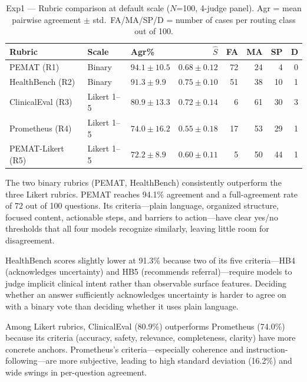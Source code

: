 \documentclass[conference]{IEEEtran}
\begin{document}
\begin{table}[t]
\caption{Exp1 --- Rubric comparison at default scale ($N$=100, 4-judge panel).
Agr = mean pairwise agreement $\pm$ std.\ FA/MA/SP/D = number of cases per routing class out of 100.}
\label{tab:exp1}
\begin{center}
\small
\begin{tabular}{lllrrrrr}
\toprule
\textbf{Rubric} & \textbf{Scale} & \textbf{Agr\%} & \textbf{$\hat{S}$} & \textbf{FA} & \textbf{MA} & \textbf{SP} & \textbf{D} \\
\midrule
PEMAT (R1)        & Binary      & $94.1 \pm 10.5$ & $0.68 \pm 0.12$ & 72 & 24 &  4 & 0 \\
HealthBench (R2)  & Binary      & $91.3 \pm 9.9$  & $0.75 \pm 0.10$ & 51 & 38 & 10 & 1 \\
ClinicalEval (R3) & Likert 1--5 & $80.9 \pm 13.3$ & $0.72 \pm 0.14$ &  6 & 61 & 30 & 3 \\
Prometheus (R4)   & Likert 1--5 & $74.0 \pm 16.2$ & $0.55 \pm 0.18$ & 17 & 53 & 29 & 1 \\
PEMAT-Likert (R5) & Likert 1--5 & $72.2 \pm 8.9$  & $0.60 \pm 0.11$ &  5 & 50 & 44 & 1 \\
\bottomrule
\end{tabular}
\end{center}
\end{table}

The two binary rubrics (PEMAT, HealthBench) consistently outperform
the three Likert rubrics. PEMAT reaches 94.1\% agreement and a
full-agreement rate of 72 out of 100 questions. Its criteria---plain
language, organized structure, focused content, actionable steps, and
barriers to action---have clear yes/no thresholds that all four models
recognize similarly, leaving little room for disagreement.

HealthBench scores slightly lower at 91.3\% because two of its five
criteria---HB4 (acknowledges uncertainty) and HB5 (recommends
referral)---require models to judge implicit clinical intent rather than
observable surface features. Deciding whether an answer sufficiently
acknowledges uncertainty is harder to agree on with a binary vote than
deciding whether it uses plain language.

Among Likert rubrics, ClinicalEval (80.9\%) outperforms Prometheus
(74.0\%) because its criteria (accuracy, safety, relevance, completeness,
clarity) have more concrete anchors. Prometheus's criteria---especially
coherence and instruction-following---are more subjective, leading to
high standard deviation (16.2\%) and wide swings in per-question agreement.
\end{document}
